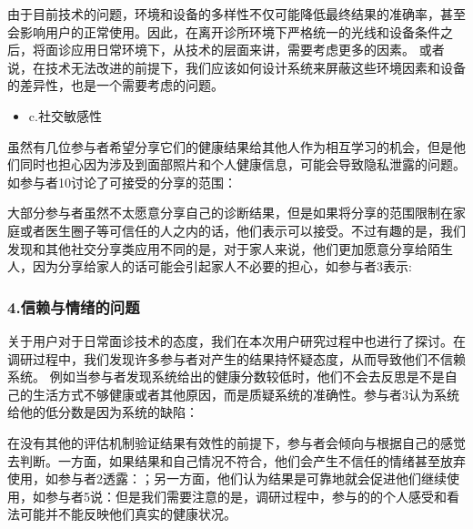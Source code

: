由于目前技术的问题，环境和设备的多样性不仅可能降低最终结果的准确率，甚至会影响用户的正常使用。因此，在离开诊所环境下严格统一的光线和设备条件之后，将面诊应用日常环境下，从技术的层面来讲，需要考虑更多的因素。
或者说，在技术无法改进的前提下，我们应该如何设计系统来屏蔽这些环境因素和设备的差异性，也是一个需要考虑的问题。

\begin{itemize}
\item c.社交敏感性
\end{itemize}


虽然有几位参与者希望分享它们的健康结果给其他人作为相互学习的机会，但是他们同时也担心因为涉及到面部照片和个人健康信息，可能会导致隐私泄露的问题。
如参与者10讨论了可接受的分享的范围：

大部分参与者虽然不太愿意分享自己的诊断结果，但是如果将分享的范围限制在家庭或者医生圈子等可信任的人之内的话，他们表示可以接受。不过有趣的是，我们发现和其他社交分享类应用不同的是，对于家人来说，他们更加愿意分享给陌生人，因为分享给家人的话可能会引起家人不必要的担心，如参与者3表示: 


\subsubsection{4.信赖与情绪的问题}
关于用户对于日常面诊技术的态度，我们在本次用户研究过程中也进行了探讨。在调研过程中，我们发现许多参与者对产生的结果持怀疑态度，从而导致他们不信赖系统。
例如当参与者发现系统给出的健康分数较低时，他们不会去反思是不是自己的生活方式不够健康或者其他原因，而是质疑系统的准确性。参与者3认为系统给他的低分数是因为系统的缺陷：

在没有其他的评估机制验证结果有效性的前提下，参与者会倾向与根据自己的感觉去判断。一方面，如果结果和自己情况不符合，他们会产生不信任的情绪甚至放弃使用，如参与者2透露：；另一方面，他们认为结果是可靠地就会促进他们继续使用，如参与者5说：但是我们需要注意的是，调研过程中，参与的的个人感受和看法可能并不能反映他们真实的健康状况。

